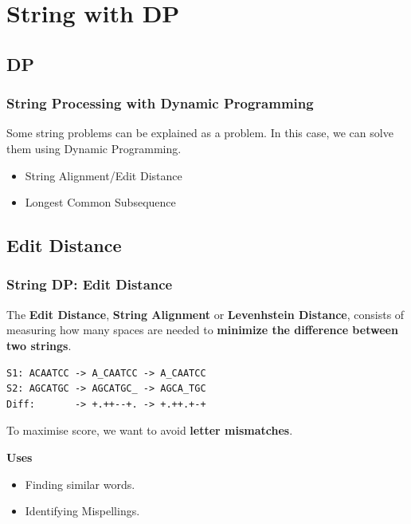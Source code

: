 \section{String with DP} %
\subsection{DP}
\begin{frame}
  \frametitle{String Processing with Dynamic Programming}
  \begin{block}{}
    Some string problems can be explained as a 
    problem. In this case, we can solve them using Dynamic Programming.\bigskip

    \begin{itemize}
    \item String Alignment/Edit Distance
    \item Longest Common Subsequence
    \end{itemize}
  \end{block}
  \bigskip
\end{frame}

\subsection{Edit Distance}
\begin{frame}[fragile]
  \frametitle{String DP: Edit Distance}
  \begin{block}{}
    The {\bf Edit Distance}, {\bf String Alignment} or {\bf Levenhstein
    Distance}, consists of measuring how many spaces are needed to {\bf
    minimize the difference between two strings}.\bigskip

\begin{verbatim}
S1: ACAATCC -> A_CAATCC -> A_CAATCC
S2: AGCATGC -> AGCATGC_ -> AGCA_TGC
Diff:       -> +.++--+. -> +.++.+-+
\end{verbatim}\bigskip

  To maximise score, we want to avoid {\bf letter mismatches}.
  \end{block}

  {\bf Uses}
  \begin{itemize}
    \item Finding similar words.
    \item Identifying Mispellings.
  \end{itemize}
\end{frame}


